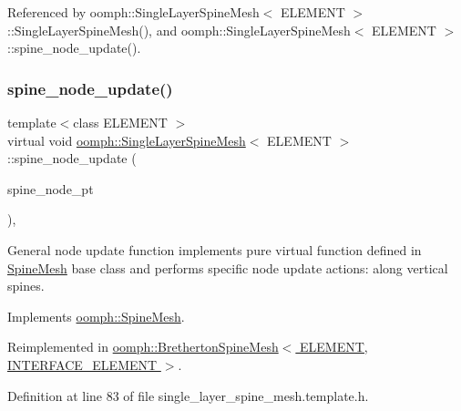 Referenced by oomph\+::\+Single\+Layer\+Spine\+Mesh$<$ E\+L\+E\+M\+E\+N\+T $>$\+::\+Single\+Layer\+Spine\+Mesh(), and oomph\+::\+Single\+Layer\+Spine\+Mesh$<$ E\+L\+E\+M\+E\+N\+T $>$\+::spine\+\_\+node\+\_\+update().

\mbox{\label{classoomph_1_1SingleLayerSpineMesh_a364648c15ab29c0c8d1cf7c2bc4cb792}} 
\subsubsection{\texorpdfstring{spine\+\_\+node\+\_\+update()}{spine\_node\_update()}}
{\footnotesize\ttfamily template$<$class E\+L\+E\+M\+E\+NT $>$ \\
virtual void \hyperlink{classoomph_1_1SingleLayerSpineMesh}{oomph\+::\+Single\+Layer\+Spine\+Mesh}$<$ E\+L\+E\+M\+E\+NT $>$\+::spine\+\_\+node\+\_\+update (\begin{DoxyParamCaption}\item[{\hyperlink{classoomph_1_1SpineNode}{Spine\+Node} $\ast$}]{spine\+\_\+node\+\_\+pt }\end{DoxyParamCaption})\hspace{0.3cm}{\ttfamily [inline]}, {\ttfamily [virtual]}}



General node update function implements pure virtual function defined in \hyperlink{classoomph_1_1SpineMesh}{Spine\+Mesh} base class and performs specific node update actions\+: along vertical spines. 



Implements \hyperlink{classoomph_1_1SpineMesh_aa7843aadce3c540f34442671f59eb75b}{oomph\+::\+Spine\+Mesh}.



Reimplemented in \hyperlink{classoomph_1_1BrethertonSpineMesh_a981301706d4940cfb24d3d769a7a523b}{oomph\+::\+Bretherton\+Spine\+Mesh$<$ E\+L\+E\+M\+E\+N\+T, I\+N\+T\+E\+R\+F\+A\+C\+E\+\_\+\+E\+L\+E\+M\+E\+N\+T $>$}.



Definition at line 83 of file single\+\_\+layer\+\_\+spine\+\_\+mesh.\+template.\+h.



